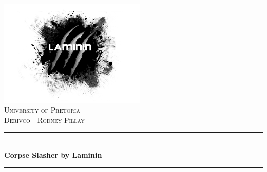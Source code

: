 \documentclass[letterpaper]{article}
\author{%
    Nico Taljaard \\
    10153285 \\%
    Gerhard Smit \\
    12282945 \\%
    Martin Schoeman \\
    10651994 \\
}
\begin{document}
\begin{titlepage}

\newcommand{\HRule}{\rule{\linewidth}{0.5mm}} %

\begin{center} %
 

\includegraphics[width=70mm]{laminin.png} \\
\textsc{\Large University of Pretoria}\\[0.2cm] %
\textsc{\large Derivco - Rodney Pillay}\\[0.2cm] %


\HRule \\[0.4cm]
{ \huge \bfseries Corpse Slasher by Laminin}\\[0.4cm] %
\HRule \\[0.5cm]
 


\end{center}
\end{titlepage}
\end{document}
